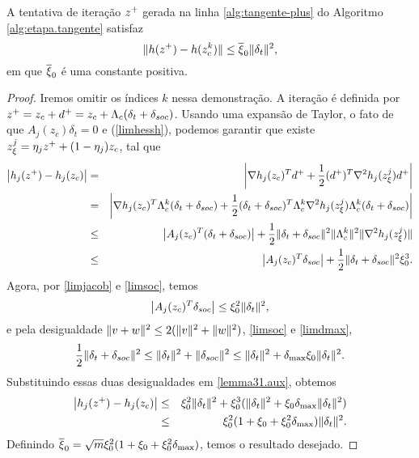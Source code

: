 \begin{lemma} 
  A tentativa de itera\c{c}\~ao $z^{+}$ gerada na
  linha \ref{alg:tangente-plus} do Algoritmo \ref{alg:etapa.tangente} satisfaz
  \begin{equation}\visiblelbl{limvarh} 
    \norma{h(\zp) - h(\zc{k})} \leq \bxi_0\norma{\delta_t}^2,
  \end{equation} 
  em que $\overline{\xi}_0$ é uma constante positiva.
\end{lemma} 
\begin{proof} Iremos
  omitir os \'indices $k$ nessa demonstra\c{c}\~ao. A itera\c{c}\~ao \'e
  definida por $z^{+} = z_c + d^{+} = z_c + \Lambda_c(\delta_t + \delta_{soc})$.  Usando
  uma expansão de Taylor, o fato de que $A_j(z_c)\delta_t = 0$ e
  (\ref{limhessh}), podemos garantir que existe $z_{\xi}^j = \eta_jz^{+} +
  (1-\eta_j)z_c$, tal que
\begin{eqnarray} 
  \left| h_j(z^{+}) - h_j(z_c)\right| & = & \left| \nabla h_j(z_c)^Td^{+} +
    \frac{1}{2}(d^{+})^T\nabla^2 h_j(z_{\xi}^j)d^{+}\right| \nonumber \\
  & = & \left| \nabla h_j(z_c)^T\Lambda_c^{k}(\delta_t+\delta_{soc}) +
      \frac{1}{2}(\delta_t+\delta_{soc})^T\Lambda_c^{k}\nabla^2 h_j(z_{\xi}^j)\Lambda_c^{k}(\delta_t +
    \delta_{soc})\right| \nonumber \\
  & \leq & \left| A_j(z_c)^T(\delta_t+\delta_{soc})\right| +
    \frac{1}{2}\Vert \delta_t+\delta_{soc}\Vert^2\Vert \Lambda_c^{k}\Vert^2\Vert \nabla^2 h_j(z_{\xi}^j)\Vert
    \nonumber \\
  & \leq & \left| A_j(z_c)^T\delta_{soc}\right| + \frac{1}{2}\Vert \delta_t+\delta_{soc}\Vert^2\xi_0^3.
    \label{lemma31.aux}
\end{eqnarray}
Agora, por \eqref{limjacob} e \eqref{limsoc}, temos
$$ \left| A_j(z_c)^T\delta_{soc}\right| \leq \xi_0^2\Vert \delta_t\Vert^2, $$
e pela desigualdade $\Vert v+w\Vert^2 \leq 2(\Vert v\Vert^2 + \Vert w\Vert^2)$,
\eqref{limsoc} e \eqref{limdmax},
$$ \frac{1}{2}\Vert \delta_t + \delta_{soc}\Vert^2 \leq \Vert \delta_t\Vert^2 + \Vert \delta_{soc}\Vert^2
\leq \Vert \delta_t\Vert^2 + \delta_{\max}\xi_0\Vert \delta_t\Vert^2. $$
Substituindo essas duas desigualdades em \eqref{lemma31.aux}, obtemos
\begin{eqnarray*}
 \left| h_j(z^{+}) - h_j(z_c)\right| 
  & \leq & \xi_0^2\Vert \delta_t\Vert^2 + \xi_0^3(\Vert \delta_t\Vert^2 +
    \xi_0\delta_{\max}\Vert \delta_t\Vert^2) \\
  & \leq & \xi_0^2(1 + \xi_0 + \xi_0^2\delta_{\max})\Vert \delta_t\Vert^2.
\end{eqnarray*} 
  Definindo $\overline{\xi}_0 = \sqrt{m}\xi_0^2(1 + \xi_0 + \xi_0^2\delta_{\max})$, temos o
  resultado desejado.
\end{proof}

